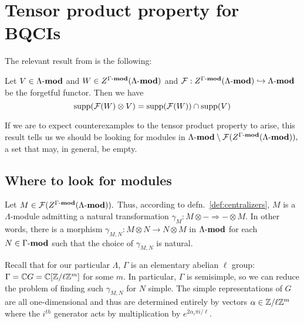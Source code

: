 \documentclass [11pt, proquest] {uwthesis}[2020/02/24]
\begin{document}
\section{Tensor product property for BQCIs}

    The relevant result from \cite{negron-pevtsovaI} is the following:
    \begin{thm}
        Let $V\in \Lambda\text{-}\mathbf{mod}$ and $W\in Z^{\Gamma\text{-}\mathbf{mod}}(\Lambda\text{-}\mathbf{mod})$ and $\mathcal{F}:Z^{\Gamma\text{-}\mathbf{mod}}(\Lambda\text{-}\mathbf{mod})\hookrightarrow\Lambda\text{-}\mathbf{mod}$ be the forgetful functor. Then we have
        \[\operatorname{supp}(\mathcal{F}(W)\otimes V)=\operatorname{supp}(\mathcal{F}(W))\cap\operatorname{supp}(V)\]
    \end{thm}
    
    
    If we are to expect counterexamples to the tensor product property to arise, this result tells us we should be looking for modules in $\Lambda\text{-}\mathbf{mod}\setminus\mathcal{F}(Z^{\Gamma\text{-}\mathbf{mod}}(\Lambda\text{-}\mathbf{mod})),$ a set that may, in general, be empty.
    
\subsection{Where to look for modules}
    Let $M\in\mathcal{F}(Z^{\Gamma\text{-}\mathbf{mod}}(\Lambda\text{-}\mathbf{mod})).$ Thus, according to defn.~\ref{def:centralizers}, $M$ is a $\Lambda$-module admitting a natural transformation $\gamma_M:M\otimes-\Rightarrow -\otimes M.$ In other words, there is a morphism $\gamma_{M,N}:M\otimes N\to N\otimes M$ in $\Lambda\text{-}\mathbf{mod}$ for each $N\in\Gamma\text{-}\mathbf{mod}$ such that the choice of $\gamma_{M,N}$ is natural.
    
    Recall that for our particular $\Lambda$, $\Gamma$ is an elementary abelian $\ell$ group: $\Gamma=\mathbb{C} G=\mathbb{C}[\mathbb{Z}/\ell\mathbb{Z}^m]$ for some $m$. In particular, $\Gamma$ is semisimple, so we can reduce the problem of finding such $\gamma_{M,N}$ for $N$ simple. The simple representations of $G$ are all one-dimensional and thus are determined entirely by vectors $\alpha\in\mathbb{Z}/\ell\mathbb{Z}^m$ where the $i^{th}$ generator acts by multiplication by $e^{2\alpha_i\pi i/\ell}.$ 

\end{document}

